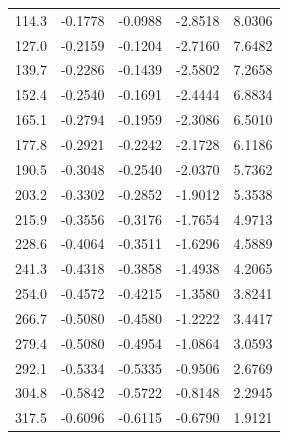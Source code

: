 \documentclass[12pt]{article}
\begin{document}
\begin{center}
\begin{tabular}{ccccc}
114.3                & -0.1778              & -0.0988              & -2.8518              & 8.0306               \\
127.0                & -0.2159              & -0.1204              & -2.7160              & 7.6482               \\
139.7                & -0.2286              & -0.1439              & -2.5802              & 7.2658               \\
152.4                & -0.2540              & -0.1691              & -2.4444              & 6.8834               \\
165.1                & -0.2794              & -0.1959              & -2.3086              & 6.5010               \\
177.8                & -0.2921              & -0.2242              & -2.1728              & 6.1186               \\
190.5                & -0.3048              & -0.2540              & -2.0370              & 5.7362               \\
203.2                & -0.3302              & -0.2852              & -1.9012              & 5.3538               \\
215.9                & -0.3556              & -0.3176              & -1.7654              & 4.9713               \\
228.6                & -0.4064              & -0.3511              & -1.6296              & 4.5889               \\
241.3                & -0.4318              & -0.3858              & -1.4938              & 4.2065               \\
254.0                & -0.4572              & -0.4215              & -1.3580              & 3.8241               \\
266.7                & -0.5080              & -0.4580              & -1.2222              & 3.4417               \\
279.4                & -0.5080              & -0.4954              & -1.0864              & 3.0593               \\
292.1                & -0.5334              & -0.5335              & -0.9506              & 2.6769               \\
304.8                & -0.5842              & -0.5722              & -0.8148              & 2.2945               \\
317.5                & -0.6096              & -0.6115              & -0.6790              & 1.9121               \\

\end{tabular}
\end{center}
\end{document}
